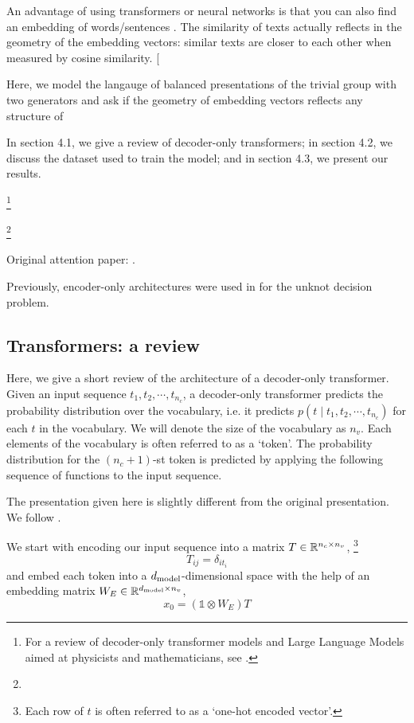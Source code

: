 An advantage of using transformers or neural networks is that you can also find an embedding of words/sentences \cite{Bengio:2003}. The similarity of texts actually reflects in the geometry of the embedding vectors: similar texts are closer to each other when measured by cosine similarity. [

Here, we model the langauge of balanced presentations of the trivial group with two generators and ask if the geometry of embedding vectors reflects any structure of 

In section 4.1, we give a review of decoder-only transformers; in section 4.2, we discuss the dataset used to train the model; and in section 4.3, we present our results. 

\footnote{For a review of decoder-only transformer models and Large Language Models aimed at physicists and mathematicians, see \cite{douglas2023large,}.}

\footnote{}

Original attention paper: \cite{vaswani2023attention}.

Previously, encoder-only architectures were used in \cite{gukov2020learning} for the unknot decision problem. 


\subsection{Transformers: a review}

Here, we give a short review of the architecture of a decoder-only transformer. Given an input sequence $t_1, t_2, \cdots, t_{n_c}$, a decoder-only transformer predicts the probability distribution over the vocabulary, i.e. it predicts $p(t \mid t_1, t_2, \cdots, t_{n_c})$ for each $t$ in the vocabulary. We will denote the size of the vocabulary as $n_v$. Each elements of the vocabulary is often referred to as a `token'. The probability distribution for the $(n_c+1)$-st token is predicted by applying the following sequence of functions to the input sequence.

The presentation given here is slightly different from the original presentation. We follow \cite{elhage2021mathematical}.

We start with encoding our input sequence into a matrix $T \in \mathbb{R}^{n_c \times n_v}$, 
\footnote{Each row of $t$ is often referred to as a `one-hot encoded vector'.}
\[
T_{ij} = \delta_{i t_i}
\]
and embed each token into a $d_{\text{model}}$-dimensional space with the help of an embedding matrix $W_E \in \mathbb{R}^{d_{\text{model}} \times n_v}$,
\[
x_0 = (\mathbb{1} \otimes W_E) T
\]

